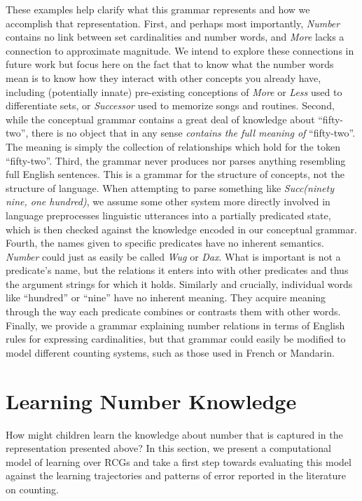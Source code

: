 \documentclass[10pt,letterpaper]{article}
\begin{document}
These examples help clarify what this grammar represents and how we
accomplish that representation. First, and perhaps most importantly,
\emph{Number} contains no link between set cardinalities and number
words, and \emph{More} lacks a connection to approximate magnitude. We
intend to explore these connections in future work but focus here on
the fact that to know what the number words mean is to know how they
interact with other concepts you already have, including (potentially
innate) pre-existing conceptions of \emph{More} or \emph{Less} used to
differentiate sets, or \emph{Successor} used to memorize songs and
routines. Second, while the conceptual grammar contains a great deal
of knowledge about ``fifty-two'', there is no object that in any sense
\emph{contains the full meaning of} ``fifty-two''. The meaning is
simply the collection of relationships which hold for the token
``fifty-two''. Third, the grammar never produces nor parses anything
resembling full English sentences. This is a grammar for the structure
of concepts, not the structure of language. When attempting to parse
something like \emph{Succ(ninety nine, one hundred)}, we assume some
other system more directly involved in language preprocesses
linguistic utterances into a partially predicated state, which is then
checked against the knowledge encoded in our conceptual grammar.
Fourth, the names given to specific predicates have no inherent
semantics. \emph{Number} could just as easily be called \emph{Wug} or
\emph{Dax}. What is important is not a predicate's name, but the
relations it enters into with other predicates and thus the argument
strings for which it holds. Similarly and crucially, individual words
like ``hundred'' or ``nine'' have no inherent meaning. They acquire
meaning through the way each predicate combines or contrasts them with
other words. Finally, we provide a grammar explaining number relations
in terms of English rules for expressing cardinalities, but that
grammar could easily be modified to model different counting systems,
such as those used in French or Mandarin.

\section{Learning Number Knowledge}

How might children learn the knowledge about number that is captured
in the representation presented above? In this section, we present a
computational model of learning over RCGs and take a first step
towards evaluating this model against the learning trajectories and
patterns of error reported in the literature on counting. 
\end{document}
